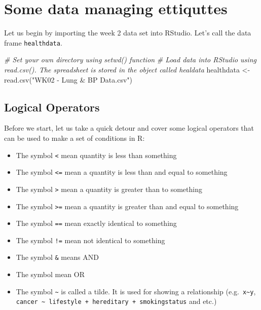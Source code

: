 \documentclass[
]{book}
\newenvironment{Shaded}{\begin{snugshade}}{\end{snugshade}}
\newcommand{\CommentTok}[1]{\textcolor[rgb]{0.56,0.35,0.01}{\textit{#1}}}
\newcommand{\FunctionTok}[1]{\textcolor[rgb]{0.00,0.00,0.00}{#1}}
\newcommand{\NormalTok}[1]{#1}
\newcommand{\OtherTok}[1]{\textcolor[rgb]{0.56,0.35,0.01}{#1}}
\newcommand{\StringTok}[1]{\textcolor[rgb]{0.31,0.60,0.02}{#1}}
\begin{document}
\hypertarget{some-data-managing-ettiquttes}{%
\section{Some data managing ettiquttes}\label{some-data-managing-ettiquttes}}

Let us begin by importing the week 2 data set into RStudio. Let's call the data frame \texttt{healthdata}.

\begin{Shaded}
\begin{Highlighting}[]
\CommentTok{\# Set your own directory using setwd() function}
\CommentTok{\# Load data into RStudio using read.csv(). The spreadsheet is stored in the object called \textquotesingle{}healdata\textquotesingle{}}
\NormalTok{healthdata }\OtherTok{\textless{}{-}} \FunctionTok{read.csv}\NormalTok{(}\StringTok{"WK02 {-} Lung \& BP Data.csv"}\NormalTok{)}
\end{Highlighting}
\end{Shaded}

\hypertarget{logical-operators}{%
\subsection{Logical Operators}\label{logical-operators}}

Before we start, let us take a quick detour and cover some logical operators that can be used to make a set of conditions in R:

\begin{itemize}
\item
  The symbol \texttt{\textless{}} mean quantity is less than something
\item
  The symbol \texttt{\textless{}=} mean a quantity is less than and equal to something
\item
  The symbol \texttt{\textgreater{}} mean a quantity is greater than to something
\item
  The symbol \texttt{\textgreater{}=} mean a quantity is greater than and equal to something
\item
  The symbol \texttt{==} mean exactly identical to something
\item
  The symbol \texttt{!=} mean not identical to something
\item
  The symbol \texttt{\&} means AND
\item
  The symbol \texttt{\textbar{}} mean OR
\item
  The symbol \texttt{\textasciitilde{}} is called a tilde. It is used for showing a relationship (e.g.~\texttt{x\textasciitilde{}y}, \texttt{cancer\ \textasciitilde{}\ lifestyle\ +\ hereditary\ +\ smokingstatus} and etc.)
\end{itemize}
\end{document}
